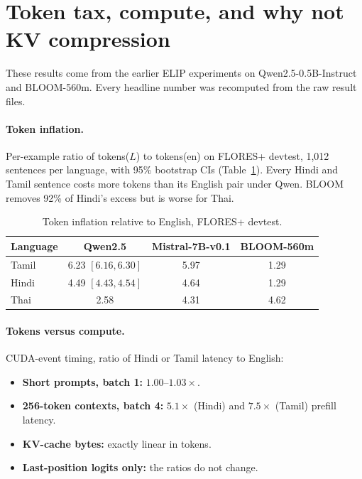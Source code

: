 \documentclass[11pt]{article}
\begin{document}



\appendix
\section{Token tax, compute, and why not KV compression}
\label{app:tax}

These results come from the earlier ELIP experiments on Qwen2.5-0.5B-Instruct and BLOOM-560m. Every headline number was recomputed from the raw result files.

\paragraph{Token inflation.} Per-example ratio of tokens($L$) to tokens(en) on FLORES+ devtest, 1,012 sentences per language, with 95\% bootstrap CIs (Table~\ref{tab:tax}). Every Hindi and Tamil sentence costs more tokens than its English pair under Qwen. BLOOM removes 92\% of Hindi's excess but is worse for Thai.

\begin{table}[h]
\centering\small
\caption{Token inflation relative to English, FLORES+ devtest.}
\label{tab:tax}
\begin{tabular}{lccc}
\toprule
Language & Qwen2.5 & Mistral-7B-v0.1 & BLOOM-560m \\
\midrule
Tamil & 6.23 $[6.16, 6.30]$ & 5.97 & 1.29 \\
Hindi & 4.49 $[4.43, 4.54]$ & 4.64 & 1.29 \\
Thai  & 2.58 & 4.31 & 4.62 \\
\bottomrule
\end{tabular}
\end{table}

\paragraph{Tokens versus compute.} CUDA-event timing, ratio of Hindi or Tamil latency to English:
\begin{itemize}
  \item \textbf{Short prompts, batch 1:} $1.00$--$1.03\times$.
  \item \textbf{256-token contexts, batch 4:} $5.1\times$ (Hindi) and $7.5\times$ (Tamil) prefill latency.
  \item \textbf{KV-cache bytes:} exactly linear in tokens.
  \item \textbf{Last-position logits only:} the ratios do not change.
\end{itemize}
\end{document}
